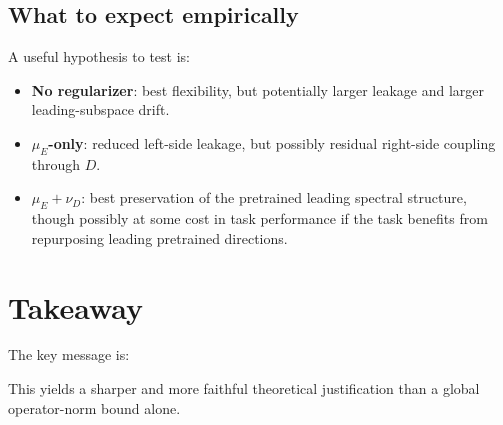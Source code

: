\documentclass[11pt]{article}
\begin{document}
\subsection{What to expect empirically}

A useful hypothesis to test is:
\begin{itemize}[leftmargin=2em]
    \item \textbf{No regularizer}: best flexibility, but potentially larger leakage and larger leading-subspace drift.
    \item \textbf{\(\mu_E\)-only}: reduced left-side leakage, but possibly residual right-side coupling through \(D\).
    \item \textbf{\(\mu_E+\nu_D\)}: best preservation of the pretrained leading spectral structure, though possibly at some cost in task performance if the task benefits from repurposing leading pretrained directions.
\end{itemize}

\section{Takeaway}

The key message is:

\begin{center}
\end{center}

This yields a sharper and more faithful theoretical justification than a global operator-norm bound alone.
\end{document}
